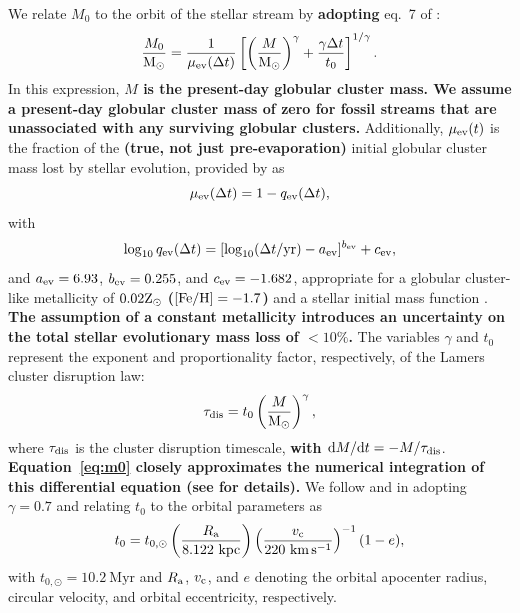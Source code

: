 \documentclass[twocolumn]{aastex63}
\newcommand{\msun}{\ensuremath{\textrm{M}_\odot}}
\newcommand{\myr}{\ensuremath{\textrm{Myr}}}
\newcommand{\kpc}{\ensuremath{\textrm{kpc}}}
\newcommand{\kms}{\ensuremath{\textrm{km}\,\textrm{s}^{-1}}}
\newcommand{\changes}[1]{{\textbf{#1}}}
\begin{document}
We relate $M_0$ to the orbit of the stellar stream by \changes{adopting} eq.~7 of \citet{lamers05}:
\begin{equation}
\label{eq:m0}
\frac{M_{\rm 0}}{\msun}=\frac{1}{\mu_{\rm ev}(\Delta t)}\left[\left(\frac{M}{\msun}\right)^\gamma+\frac{\gamma \Delta t}{t_0}\right]^{1/\gamma} .
\end{equation}
In this expression, \changes{$M$ is the present-day globular cluster mass.
We assume a present-day globular cluster mass of zero for fossil streams that are unassociated with any surviving globular clusters.}
Additionally, $\mu_{\rm ev}(t)$ is the fraction of the \changes{(true, not just pre-evaporation)} initial globular cluster mass lost by stellar evolution, provided by \citet{lamers05} as
\begin{equation}
\label{eq:muev}
\mu_{\rm ev}(\Delta t)=1-q_{\rm ev}(\Delta t) ,
\end{equation}
with
\begin{equation}
\label{eq:qev}
\log_{10}{q_{\rm ev}}(\Delta t) = [\log_{10}(\Delta t/{\rm yr})-a_{\rm ev}]^{b_{\rm ev}}+c_{\rm ev} ,
\end{equation}
and $a_{\rm ev} = 6.93$, $b_{\rm ev} = 0.255$, and $c_{\rm ev} = -1.682$, appropriate for a globular cluster-like metallicity of $0.02{\rm Z}_\odot$ \changes{($[{\rm Fe}/{\rm H}]=-1.7$)} and a \citet{kroupa01} stellar initial mass function \citep{kruijssen08}.
\changes{The assumption of a constant metallicity introduces an uncertainty on the total stellar evolutionary mass loss of $<10\%$.}
The variables $\gamma$ and $t_0$ represent the exponent and proportionality factor, respectively, of the Lamers cluster disruption law:
\begin{equation}
\label{eq:lamers}
\tau_{\rm dis}=t_0\left(\frac{M}{\msun}\right)^\gamma ,
\end{equation}
where $\tau_{\rm dis}$ is the cluster disruption timescale, \changes{with ${\rm d}M/{\rm d}t=-M/\tau_{\rm dis}$}.
\changes{Equation~\ref{eq:m0} closely approximates the numerical integration of this differential equation (see \citealt{lamers05} for details).}
We follow \citet{kruijssen09} and \citet{lamers:2010} in adopting $\gamma=0.7$ and relating $t_0$ to the orbital parameters as
\begin{equation}
\label{eq:t0}
t_0 = t_{0,\odot}\left(\frac{R_{\rm a}}{8.122~\kpc}\right)\left(\frac{v_{\rm c}}{220~\kms}\right)^{-1}(1-e) ,
\end{equation}
with $t_{0,\odot}=10.2~\myr$ and $R_{\rm a}$, $v_{\rm c}$, and $e$ denoting the orbital apocenter radius, circular velocity, and orbital eccentricity, respectively. 
\end{document}
